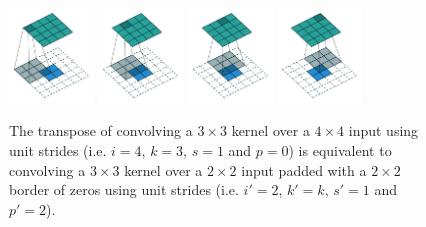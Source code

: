 \documentclass{article}
\begin{document}
\begin{figure}[t]
    \centering
    \includegraphics[width=0.2\textwidth]
        {pdf/no_padding_no_strides_transposed_00.pdf}
    \includegraphics[width=0.2\textwidth]
        {pdf/no_padding_no_strides_transposed_01.pdf}
    \includegraphics[width=0.2\textwidth]
        {pdf/no_padding_no_strides_transposed_02.pdf}
    \includegraphics[width=0.2\textwidth]
        {pdf/no_padding_no_strides_transposed_03.pdf}
    \caption{\label{fig:no_padding_no_strides_transposed} The transpose of
        convolving a $3 \times 3$ kernel over a $4 \times 4$ input using unit
        strides (i.e. $i = 4$, $k = 3$, $s = 1$ and $p = 0$) is equivalent to
        convolving a $3 \times 3$ kernel over a $2 \times 2$ input padded with
        a $2 \times 2$ border of zeros using unit strides (i.e. $i' = 2$, $k' =
        k$, $s' = 1$ and $p' = 2$).}
\end{figure}
\end{document}
